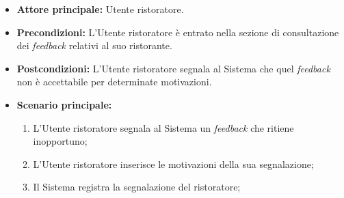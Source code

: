 \label{usecase:Segnalazione di un feedback}
\begin{itemize}
	\item \textbf{Attore principale:} Utente ristoratore.

	\item \textbf{Precondizioni:} L'Utente ristoratore è entrato nella sezione di consultazione dei \textit{feedback} relativi al suo ristorante.

	\item \textbf{Postcondizioni:} L'Utente ristoratore segnala al Sistema che quel \textit{feedback} non è accettabile per determinate motivazioni.


	\item \textbf{Scenario principale:}
	      \begin{enumerate}
		      \item L'Utente ristoratore segnala al Sistema un \textit{feedback} che ritiene inopportuno;
		      \item L'Utente ristoratore inserisce le motivazioni della sua segnalazione;
		      \item Il Sistema registra la segnalazione del ristoratore;

	      \end{enumerate}
\end{itemize}
